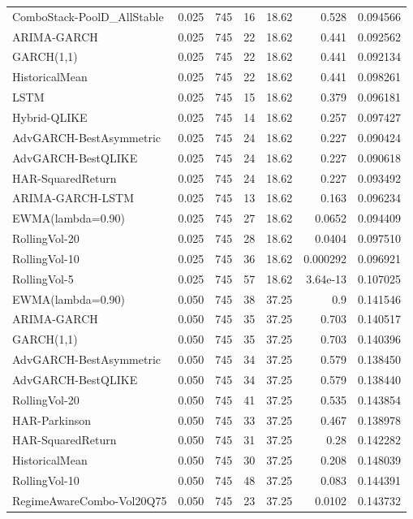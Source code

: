 \begin{table}[!t]
\begin{tabular}{@{}lrrrrrr@{}}
ComboStack-PoolD\_AllStable & 0.025 & 745 & 16 & 18.62 & 0.528 & 0.094566 \\
ARIMA-GARCH & 0.025 & 745 & 22 & 18.62 & 0.441 & 0.092562 \\
GARCH(1,1) & 0.025 & 745 & 22 & 18.62 & 0.441 & 0.092134 \\
HistoricalMean & 0.025 & 745 & 22 & 18.62 & 0.441 & 0.098261 \\
LSTM & 0.025 & 745 & 15 & 18.62 & 0.379 & 0.096181 \\
Hybrid-QLIKE & 0.025 & 745 & 14 & 18.62 & 0.257 & 0.097427 \\
AdvGARCH-BestAsymmetric & 0.025 & 745 & 24 & 18.62 & 0.227 & 0.090424 \\
AdvGARCH-BestQLIKE & 0.025 & 745 & 24 & 18.62 & 0.227 & 0.090618 \\
HAR-SquaredReturn & 0.025 & 745 & 24 & 18.62 & 0.227 & 0.093492 \\
ARIMA-GARCH-LSTM & 0.025 & 745 & 13 & 18.62 & 0.163 & 0.096234 \\
EWMA(lambda=0.90) & 0.025 & 745 & 27 & 18.62 & 0.0652 & 0.094409 \\
RollingVol-20 & 0.025 & 745 & 28 & 18.62 & 0.0404 & 0.097510 \\
RollingVol-10 & 0.025 & 745 & 36 & 18.62 & 0.000292 & 0.096921 \\
RollingVol-5 & 0.025 & 745 & 57 & 18.62 & 3.64e-13 & 0.107025 \\
EWMA(lambda=0.90) & 0.050 & 745 & 38 & 37.25 & 0.9 & 0.141546 \\
ARIMA-GARCH & 0.050 & 745 & 35 & 37.25 & 0.703 & 0.140517 \\
GARCH(1,1) & 0.050 & 745 & 35 & 37.25 & 0.703 & 0.140396 \\
AdvGARCH-BestAsymmetric & 0.050 & 745 & 34 & 37.25 & 0.579 & 0.138450 \\
AdvGARCH-BestQLIKE & 0.050 & 745 & 34 & 37.25 & 0.579 & 0.138440 \\
RollingVol-20 & 0.050 & 745 & 41 & 37.25 & 0.535 & 0.143854 \\
HAR-Parkinson & 0.050 & 745 & 33 & 37.25 & 0.467 & 0.138978 \\
HAR-SquaredReturn & 0.050 & 745 & 31 & 37.25 & 0.28 & 0.142282 \\
HistoricalMean & 0.050 & 745 & 30 & 37.25 & 0.208 & 0.148039 \\
RollingVol-10 & 0.050 & 745 & 48 & 37.25 & 0.083 & 0.144391 \\
RegimeAwareCombo-Vol20Q75 & 0.050 & 745 & 23 & 37.25 & 0.0102 & 0.143732 \\

\end{tabular}
\end{table}

